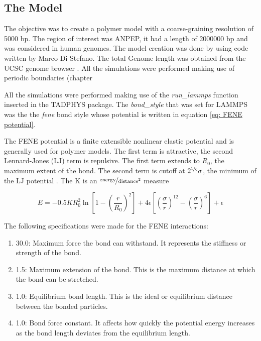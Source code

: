 
\subsection{The Model}
The objective was to create a polymer model with a coarse-graining resolution of 5000 bp. The region of interest was ANPEP, it had a length of 2000000 bp and was considered in human genomes. 
The model creation was done by using code written by Marco Di Stefano.
The total Genome length was obtained from the UCSC genome browser
\cite{UCSCGenomeBrowser}
. All the simulations were performed making use of periodic boundaries (chapter %

All the simulations were performed making use of the \textit{run\_lammps} function inserted in the TADPHYS package. The \textit{bond\_style} that was set for LAMMPS
\cite{thompsonLAMMPSFlexibleSimulation2022}
was the the \textit{fene} bond style whose potential is written in equation \ref{eq: FENE potential}. 

The FENE potential is a finite extensible nonlinear elastic potential and is generally used for polymer models. The first term is attractive, the second Lennard-Jones (LJ) term is repulsive. The first term extends to $R_0$, the maximum extent of the bond. The second term is cutoff at $2^{\nicefrac{1}{6}} \sigma$, the minimum of the LJ potential
\cite{thompsonLAMMPSFlexibleSimulation2022}
. The K is an $\nicefrac{\text{energy}}{\text{distance}^2}$ measure

\begin{equation} \label{eq: FENE potential}
    E = -0.5 K R_0^2 \ln{\left[1 - \left(\frac{r}{R_0}\right)^2\right]} + 4 \epsilon \left[\left(\frac{\sigma}{r}\right)^{12} - \left(\frac{\sigma}{r}\right)^6\right] + \epsilon
\end{equation}

The following specifications were made for the FENE interactions:

\begin{enumerate} %
    \item 30.0: Maximum force the bond can withstand. It represents the stiffness or strength of the bond.
    \item 1.5: Maximum extension of the bond. This is the maximum distance at which the bond can be stretched.
    \item 1.0: Equilibrium bond length. This is the ideal or equilibrium distance between the bonded particles.
    \item 1.0: Bond force constant. It affects how quickly the potential energy increases as the bond length deviates from the equilibrium length.
\end{enumerate}

